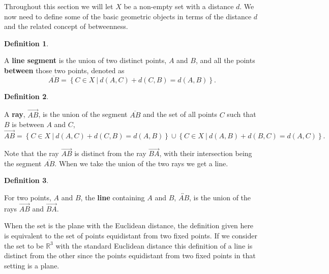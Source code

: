 \documentclass[
]{book}
\theoremstyle{definition}
\newtheorem{definition}{Definition}[chapter]
\theoremstyle{definition}
\theoremstyle{definition}
\theoremstyle{definition}
\theoremstyle{remark}
\begin{document}
Throughout this section we will let \(X\) be a non-empty set with a distance \(d\). We now need to define some of the basic geometric objects in terms of the distance \(d\) and the related concept of betweenness.

\begin{definition}
\protect\hypertarget{def:unlabeled-div-234}{}\label{def:unlabeled-div-234}

A \textbf{line segment} is the union of two distinct points, \(A\) and \(B\), and all the points \textbf{between} those two points, denoted as \[\overline{AB} = \left\{ C \in X \: \vert \: d(A,C) + d(C,B) = d(A,B)\right\}.\]

\end{definition}

\begin{definition}
\protect\hypertarget{def:unlabeled-div-235}{}\label{def:unlabeled-div-235}

A \textbf{ray}, \(\overrightarrow{AB}\), is the union of the segment \(\overline{AB}\) and the set of all points \(C\) such that \(B\) is between \(A\) and \(C\),
\[\overrightarrow{AB} = \left\{C \in X \: \vert \: d(A,C)+d(C,B)=d(A,B)\right\} \cup \left\{C \in X \: \vert \: d(A,B)+d(B,C)=d(A,C)\right\}.\]

\end{definition}

Note that the ray \(\overrightarrow{AB}\) is distinct from the ray \(\overrightarrow{BA}\), with their intersection being the segment \(\overline{AB}\). When we take the union of the two rays we get a line.

\begin{definition}
\protect\hypertarget{def:unlabeled-div-236}{}\label{def:unlabeled-div-236}

For two points, \(A\) and \(B\), the \textbf{line} containing \(A\) and \(B\), \(\overleftrightarrow{AB}\), is the union of the rays \(\overrightarrow{AB}\) and \(\overrightarrow{BA}\).

\end{definition}

When the set is the plane with the Euclidean distance, the definition given here is equivalent to the set of points equidistant from two fixed points. If we consider the set to be \(\mathbb{R}^3\) with the standard Euclidean distance this definition of a line is distinct from the other since the points equidistant from two fixed points in that setting is a plane.
\end{document}
